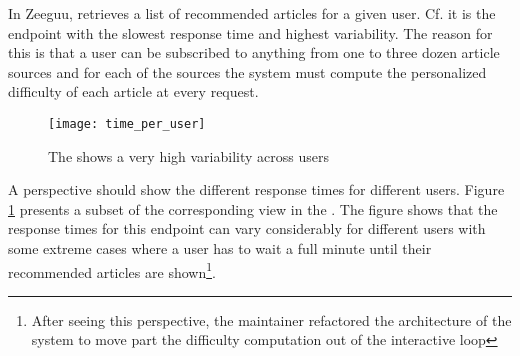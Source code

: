 
In Zeeguu, \epFeedItems retrieves a list of recommended articles for a given user. Cf.  it is the endpoint with the slowest response time and highest variability. The reason for this is that a user can be subscribed to anything from one to three dozen article sources and for each of the sources the system must compute the personalized difficulty of each article at every request. 


\begin{figure}[h!]
  \centering
  \texttt{[image: time\_per\_user]}
  \caption{The \epFeedItems shows a very high variability across users}
  \label{fig:tpu}
\end{figure}


A  perspective should show the different response times for different users. Figure \ref{fig:tpu} presents a subset of the corresponding view in the \tool. The figure shows that the response times for this endpoint can vary considerably for different users with some extreme cases where a user has to wait a full minute until their recommended articles are shown\footnote{After seeing this perspective, the maintainer refactored the architecture of the system to move part the difficulty computation out of the interactive loop}.






